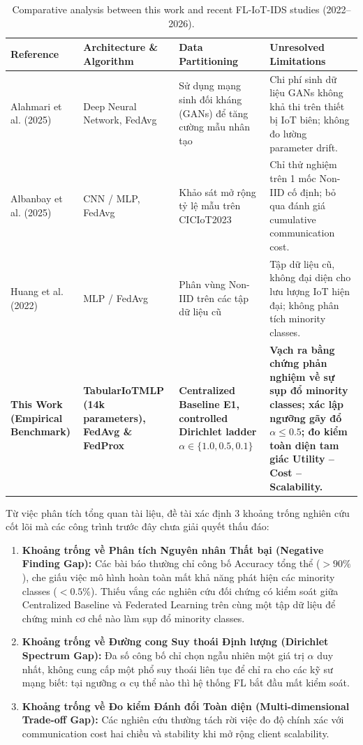 \begin{table}[htbp]
\centering
\caption{Comparative analysis between this work and recent FL-IoT-IDS studies (2022--2026).}
\label{tab:lit_review_matrix}
\footnotesize
\renewcommand{\arraystretch}{0.95}
\begin{tabularx}{\textwidth}{p{3.0cm} p{3.2cm} p{3.8cm} X}
\toprule
\textbf{Reference} & \textbf{Architecture \& Algorithm} & \textbf{Data Partitioning} & \textbf{Unresolved Limitations} \\
\midrule
Alahmari et al. (2025) \cite{alahmari2025enhancing} & Deep Neural Network, FedAvg & Sử dụng mạng sinh đối kháng (GANs) để tăng cường mẫu nhân tạo & Chi phí sinh dữ liệu GANs không khả thi trên thiết bị IoT biên; không đo lường parameter drift. \\
\addlinespace
Albanbay et al. (2025) \cite{albanbay2025federated} & CNN / MLP, FedAvg & Khảo sát mở rộng tỷ lệ mẫu trên CICIoT2023 & Chỉ thử nghiệm trên 1 mốc Non-IID cố định; bỏ qua đánh giá cumulative communication cost. \\
\addlinespace
Huang et al. (2022) \cite{huang2022federated} & MLP / FedAvg & Phân vùng Non-IID trên các tập dữ liệu cũ & Tập dữ liệu cũ, không đại diện cho lưu lượng IoT hiện đại; không phân tích minority classes. \\
\addlinespace
\textbf{This Work (Empirical Benchmark)} & \textbf{TabularIoTMLP (14k parameters), FedAvg \& FedProx} & \textbf{Centralized Baseline E1, controlled Dirichlet ladder $\alpha \in \{1.0, 0.5, 0.1\}$} & \textbf{Vạch ra bằng chứng phản nghiệm về sự sụp đổ minority classes; xác lập ngưỡng gãy đổ $\alpha \le 0.5$; đo kiểm toàn diện tam giác Utility -- Cost -- Scalability.} \\
\bottomrule
\end{tabularx}
\end{table}

Từ việc phân tích tổng quan tài liệu, đề tài xác định 3 khoảng trống nghiên cứu cốt lõi mà các công trình trước đây chưa giải quyết thấu đáo:
\begin{enumerate}
    \item \textbf{Khoảng trống về Phân tích Nguyên nhân Thất bại (Negative Finding Gap):} Các bài báo thường chỉ công bố Accuracy tổng thể ($>90\%$), che giấu việc mô hình hoàn toàn mất khả năng phát hiện các minority classes ($<0.5\%$). Thiếu vắng các nghiên cứu đối chứng có kiểm soát giữa Centralized Baseline và Federated Learning trên cùng một tập dữ liệu để chứng minh cơ chế nào làm sụp đổ minority classes.
    \item \textbf{Khoảng trống về Đường cong Suy thoái Định lượng (Dirichlet Spectrum Gap):} Đa số công bố chỉ chọn ngẫu nhiên một giá trị $\alpha$ duy nhất, không cung cấp một phổ suy thoái liên tục để chỉ ra cho các kỹ sư mạng biết: tại ngưỡng $\alpha$ cụ thể nào thì hệ thống FL bắt đầu mất kiểm soát.
    \item \textbf{Khoảng trống về Đo kiểm Đánh đổi Toàn diện (Multi-dimensional Trade-off Gap):} Các nghiên cứu thường tách rời việc đo độ chính xác với communication cost hai chiều và stability khi mở rộng client scalability.
\end{enumerate}
